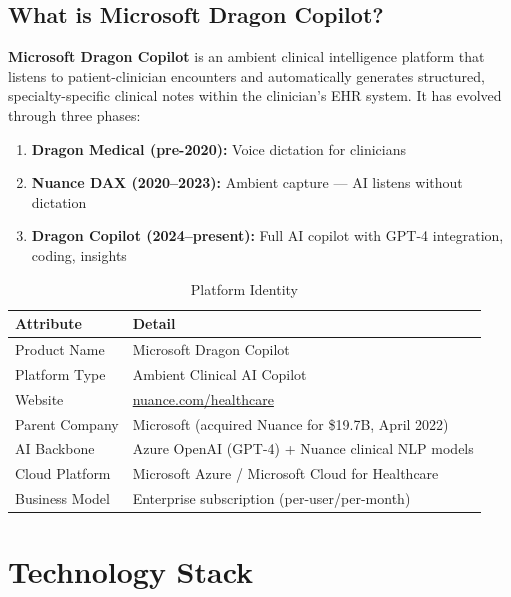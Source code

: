 \documentclass[12pt,a4paper]{article}
\begin{document}
\subsection{What is Microsoft Dragon Copilot?}
\textbf{Microsoft Dragon Copilot} is an ambient clinical intelligence platform that listens to patient-clinician encounters and automatically generates structured, specialty-specific clinical notes within the clinician's EHR system. It has evolved through three phases:
\begin{enumerate}[noitemsep]
    \item \textbf{Dragon Medical (pre-2020):} Voice dictation for clinicians
    \item \textbf{Nuance DAX (2020--2023):} Ambient capture --- AI listens without dictation
    \item \textbf{Dragon Copilot (2024--present):} Full AI copilot with GPT-4 integration, coding, insights
\end{enumerate}

\begin{table}[H]\centering\renewcommand{\arraystretch}{1.4}
\begin{tabularx}{\textwidth}{lX}\toprule
\textbf{Attribute} & \textbf{Detail}\\\midrule
Product Name     & Microsoft Dragon Copilot \\
Platform Type    & Ambient Clinical AI Copilot \\
Website          & \href{https://nuance.com/healthcare}{nuance.com/healthcare} \\
Parent Company   & Microsoft (acquired Nuance for \$19.7B, April 2022) \\
AI Backbone      & Azure OpenAI (GPT-4) + Nuance clinical NLP models \\
Cloud Platform   & Microsoft Azure / Microsoft Cloud for Healthcare \\
Business Model   & Enterprise subscription (per-user/per-month) \\
\bottomrule\end{tabularx}\caption{Platform Identity}\end{table}

\section{Technology Stack}
\end{document}
